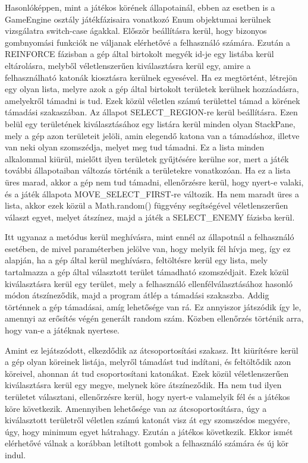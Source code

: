 Hasonlóképpen, mint a játékos körének állapotainál, ebben az esetben is a GameEngine osztály játékfázisaira vonatkozó Enum objektumai kerülnek vizsgálatra switch-case ágakkal. Először beállításra kerül, hogy bizonyos gombnyomási funkciók ne váljanak elérhetővé a felhasználó számára. Ezután a REINFORCE fázisban a gép által birtokolt megyék id-je egy listába kerül eltárolásra, melyből véletlenszerűen kiválasztásra kerül egy, amire a felhasználható katonák kiosztásra kerülnek egyesével. Ha ez megtörtént, létrejön egy olyan lista, melyre azok a gép által birtokolt területek kerülnek hozzáadásra, amelyekről támadni is tud. Ezek közül véletlen számú területtel támad a körének támadási szakaszában. Az állapot SELECT\_REGION-re kerül beállításra. Ezen belül egy területének kiválasztásához egy listára kerül minden olyan StackPane, mely a gép azon területeit jelöli, amin elegendő katona van a támadáshoz, illetve van neki olyan szomszédja, melyet meg tud támadni. Ez a lista minden alkalommal kiürül, mielőtt ilyen területek gyűjtésére kerülne sor, mert a játék további állapotaiban változás történik a területekre vonatkozóan. Ha ez a lista üres marad, akkor a gép nem tud támadni, ellenőrzésre kerül, hogy nyert-e valaki, és a játék állapota MOVE\_SELECT\_FIRST-re változik. Ha nem maradt üres a lista, akkor ezek közül a Math.random() függvény segítségével véletlenszerűen választ egyet, melyet átszínez, majd a játék a SELECT\_ENEMY fázisba kerül. 

Itt ugyanaz a metódus kerül meghívásra, mint ennél az állapotnál a felhasználó esetében, de mivel paraméterben jelölve van, hogy melyik fél hívja meg, így ez alapján, ha a gép által kerül meghívásra, feltöltésre kerül egy lista, mely tartalmazza a gép által választott terület támadható szomszédjait. Ezek közül kiválasztásra kerül egy terület, mely a felhasználó ellenfélválasztásához hasonló módon átszíneződik, majd a program átlép a támadási szakaszba. Addig történnek a gép támadásai, amíg lehetősége van rá. Ez annyiszor játszódik így le, amennyi az erősítés végén generált random szám. Közben ellenőrzés történik arra, hogy van-e a játéknak nyertese. 

Amint ez lejátszódott, elkezdődik az átcsoportosítási szakasz. Itt kiürítésre kerül a gép olyan köreinek listája, melyről támadást tud indítani, és feltöltődik azon köreivel, ahonnan át tud csoportosítani katonákat. Ezek közül véletlenszerűen kiválasztásra kerül egy megye, melynek köre átszíneződik. Ha nem tud ilyen területet választani, ellenőrzésre kerül, hogy nyert-e valamelyik fél és a játékos köre következik. Amennyiben lehetősége van az átcsoportosításra, úgy a kiválasztott területről véletlen számú katonát visz át egy szomszédos megyére, úgy, hogy minimum egyet hátrahagy. Ezután a játékos következik. Ekkor ismét elérhetővé válnak a korábban letiltott gombok a felhasználó számára és új kör indul. 

